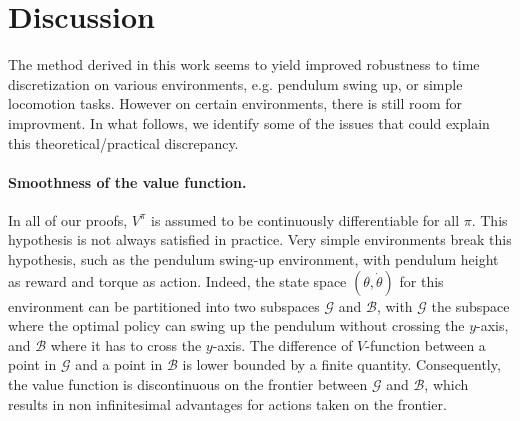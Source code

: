 \section{Discussion}
\label{sec:discussions}

The method derived in this work seems to yield improved robustness to
time discretization on various environments, e.g. pendulum swing up, or
simple locomotion tasks.  However on certain environments, there is still
room for improvment. In what follows, we identify some of the issues
that could explain this theoretical/practical discrepancy.

\paragraph{Smoothness of the value function.} In all of our proofs, $V^\pi$ is
assumed to be continuously differentiable for all $\pi$.  This %
hypothesis is not always satisfied in practice. Very simple environments
break this hypothesis, such as the pendulum swing-up environment,
with pendulum height as reward and torque as action.  Indeed, 
the state space $(\theta, \dot{\theta})$ for this environment
can be partitioned into two subspaces $\mathcal{G}$ and $\mathcal{B}$, with
$\mathcal{G}$ the subspace where the optimal policy 
can swing up the pendulum without crossing the $y$-axis, and $\mathcal{B}$ where
it has to cross the $y$-axis. The difference of $V$-function between a point in
$\mathcal{G}$ and a point in $\mathcal{B}$ is lower bounded by a finite
quantity. 
Consequently, the value function is
discontinuous on the frontier between $\mathcal{G}$ and $\mathcal{B}$, which results in non infinitesimal advantages
for actions taken on the frontier. 

